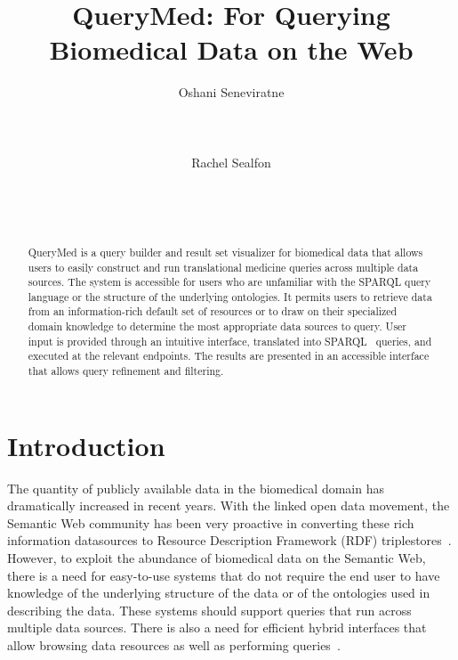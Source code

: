 \documentclass{acm_proc_article-sp}
\begin{document}
\title{QueryMed: For Querying Biomedical Data on the Web}


\author{
\alignauthor Oshani Seneviratne\\
       \\
       \\
       \\
\alignauthor Rachel Sealfon\\
       \\
       \\
       \\
}


\maketitle
\begin{abstract}

QueryMed is a query builder and result set visualizer for biomedical data that allows users to easily construct and run translational medicine queries across multiple data sources. The system is accessible for users who are unfamiliar with the SPARQL query language 
or the structure of the underlying ontologies. It permits users to retrieve data from an information-rich default set of resources or to draw on their specialized domain knowledge to determine the most appropriate data sources to query.  User input is provided through an intuitive interface, translated into SPARQL~\cite{SPARQL} queries, and executed at the relevant endpoints. The results are presented in an accessible interface that allows query refinement and filtering.  

\end{abstract}


\section{Introduction}

The quantity of publicly available data in the biomedical domain has dramatically increased in recent years. With the linked open data movement, the Semantic Web community has been very proactive in converting these rich information datasources to Resource Description Framework (RDF) triplestores~\cite{LinkingData, Yip}.  However, to exploit the abundance of biomedical data on the Semantic Web, there is a need for easy-to-use systems that do not require the end user to have knowledge of the underlying  structure of the data or of the ontologies used in describing the data. These systems should support queries that run across multiple data sources.  There is also a  need for efficient hybrid interfaces that allow browsing data resources as well as performing queries~\cite{Jentzsch}.  
\end{document}
